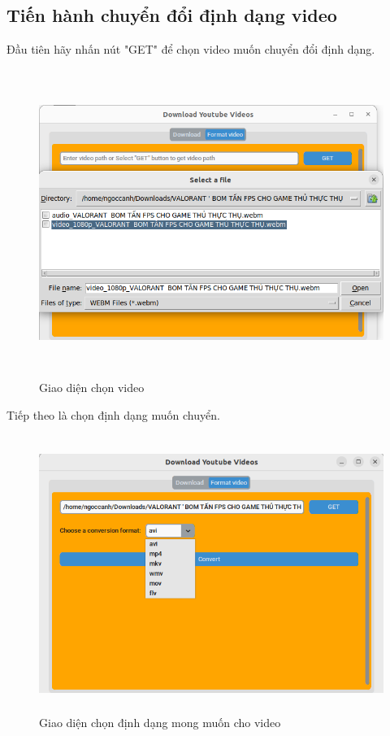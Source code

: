 \documentclass{article} %
\begin{document}
\subsection{Tiến hành chuyển đổi định dạng video}
Đầu tiên hãy nhấn nút "GET" để chọn video muốn chuyển đổi định dạng.
\begin{figure}[H]
    \centering
    \includegraphics[width=15cm, height=10cm]{images/tienhanh5.PNG}
    \caption{Giao diện chọn video}
    \label{fig:enter-label}
\end{figure}
Tiếp theo là chọn định dạng muốn chuyển.
\begin{figure}[H]
    \centering
    \includegraphics[width=14cm, height=9cm]{images/tienhanh6.PNG}
    \caption{Giao diện chọn định dạng mong muốn cho video}
    \label{fig:enter-label}
\end{figure}
\end{document}
